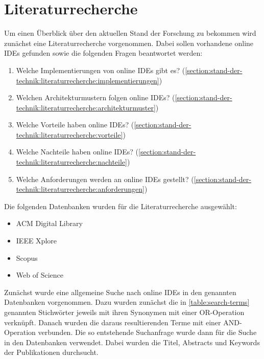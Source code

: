 \section{Literaturrecherche}\label{section:stand-der-technik:literaturrecherche}

Um einen Überblick über den aktuellen Stand der Forschung zu bekommen wird zunächst eine Literaturrecherche vorgenommen. Dabei sollen vorhandene online IDEs gefunden sowie die folgenden Fragen beantwortet werden:

\begin{enumerate}
    \item Welche Implementierungen von online IDEs gibt es? \hfill (\autoref{section:stand-der-technik:literaturrecherche:implementierungen})
    \item Welchen Architekturmustern folgen online IDEs? \hfill (\autoref{section:stand-der-technik:literaturrecherche:architekturmuster})
    \item Welche Vorteile haben online IDEs? \hfill (\autoref{section:stand-der-technik:literaturrecherche:vorteile})
    \item Welche Nachteile haben online IDEs? \hfill (\autoref{section:stand-der-technik:literaturrecherche:nachteile})
    \item Welche Anforderungen werden an online IDEs gestellt? \hfill (\autoref{section:stand-der-technik:literaturrecherche:anforderungen})
\end{enumerate}

Die folgenden Datenbanken wurden für die Literaturrecherche ausgewählt:

\begin{itemize}
    \item ACM Digital Library \cite{noauthor_acm_nodate}
    \item IEEE Xplore \cite{noauthor_ieee-xplore_nodate}
    \item Scopus \cite{noauthor_scopus_nodate}
    \item Web of Science \cite{noauthor_web-of-science_nodate}
\end{itemize}

Zunächst wurde eine allgemeine Suche nach online IDEs in den genannten Datenbanken vorgenommen. Dazu wurden zunächst die in \autoref{table:search-terms} genannten Stichwörter jeweils mit ihren Synonymen mit einer OR-Operation verknüpft. Danach wurden die daraus resultierenden Terme mit einer AND-Operation verbunden. Die so entstehende Suchanfrage wurde dann für die Suche in den Datenbanken verwendet. Dabei wurden die Titel, Abstracts und Keywords der Publikationen durchsucht.

